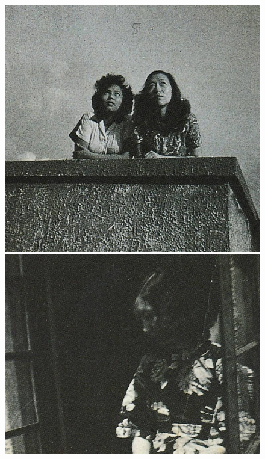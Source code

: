 \begin{figure}[htb]
    \includegraphics[scale=0.25]{picture/对照记29.jpeg}
    \includegraphics[scale=0.25]{picture/对照记30.jpeg}
\end{figure}

